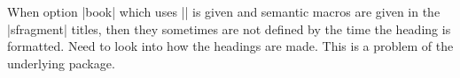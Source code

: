 \begin{dangerbox}
  When option |book| which uses |\pagestyle{headings}| is given and semantic macros are
  given in the |sfragment| titles, then they sometimes are not defined by the time the
  heading is formatted. Need to look into how the headings are made. This is a problem of
  the underlying  package.
\end{dangerbox}

